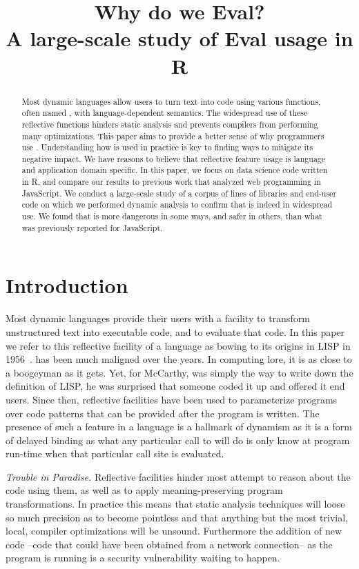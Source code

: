 \documentclass[USenglish,cleveref, autoref, thm-restate]{lipics-v2019}
\title{Why do we Eval?\\[2mm]\Large A large-scale study of Eval usage in R}
\begin{document}
\maketitle

\begin{abstract}
  \noindent Most dynamic languages allow users to turn text into code
  using various functions, often named \eval, with language-dependent
  semantics. The widespread use of these reflective functions hinders
  static analysis and prevents compilers from performing many
  optimizations. This paper aims to provide a better sense of why
  programmers use \eval.  Understanding how \eval is used in practice
  is key to finding ways to mitigate its negative impact. We have
  reasons to believe that reflective feature usage is language and
  application domain specific. In this paper, we focus on data science
  code written in R, and compare our results to previous work that
  analyzed web programming in JavaScript.  We conduct a large-scale
  study of a corpus of \CorpusAllCodeRnd lines of libraries and
  end-user code on which we performed dynamic analysis to confirm that
  \eval is indeed in widespread use. We found that \eval is more
  dangerous in some ways, and safer in others, than what was
  previously reported for JavaScript.
\end{abstract}


\section{Introduction}

Most dynamic languages provide their users with a facility to
transform unstructured text into executable code, and to evaluate that
code. In this paper we refer to this reflective facility of a language
as \eval bowing to its origins in LISP in 1956~\cite{lisp}. \Eval has
been much maligned over the years. In computing lore, it is as close
to a boogeyman as it gets. Yet, for McCarthy, \eval was simply the way
to write down the definition of LISP, he was surprised that someone
coded it up and offered it end users.  Since then, reflective
facilities have been used to parameterize programs over code patterns
that can be provided after the program is written.  The presence of
such a feature in a language is a hallmark of dynamism as it is a form
of delayed binding as what any particular call to \eval will do is
only know at program run-time when that particular call site is
evaluated.

\vspace{2mm}\noindent\emph{Trouble in Paradise.} Reflective facilities
hinder most attempt to reason about the code using them, as well as to
apply meaning-preserving program transformations. In practice this
means that static analysis techniques will loose so much precision as
to become pointless and that anything but the most trivial, local,
compiler optimizations will be unsound. Furthermore the addition of
new code --code that could have been obtained from a network
connection-- as the program is running is a security vulnerability
waiting to happen.
\end{document}
